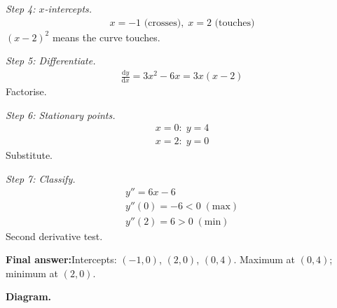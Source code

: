 \documentclass[11pt]{article}
\begin{document}
\textit{Step 4: \( x \)-intercepts.}
\[\begin{gathered}
x = -1 \text{ (crosses)},\; x = 2 \text{ (touches)}
\end{gathered}\]
\( (x - 2)^2 \) means the curve touches.

\textit{Step 5: Differentiate.}
\[\begin{gathered}
\frac{\mathrm{d}y}{\mathrm{d}x} = 3x^2 - 6x = 3x(x - 2)
\end{gathered}\]
Factorise.

\textit{Step 6: Stationary points.}
\[\begin{gathered}
x = 0: \; y = 4 \\ x = 2: \; y = 0
\end{gathered}\]
Substitute.

\textit{Step 7: Classify.}
\[\begin{gathered}
y'' = 6x - 6 \\ y''(0) = -6 < 0\; (\text{max}) \\ y''(2) = 6 > 0\; (\text{min})
\end{gathered}\]
Second derivative test.

\begin{answerbox}
\textbf{Final answer:}\quad Intercepts: \(\displaystyle  (-1, 0) \), \(\displaystyle  (2, 0) \), \(\displaystyle  (0, 4) \). Maximum at \(\displaystyle  (0, 4) \); minimum at \(\displaystyle  (2, 0) \).
\end{answerbox}
\textbf{Diagram.}
\end{document}

